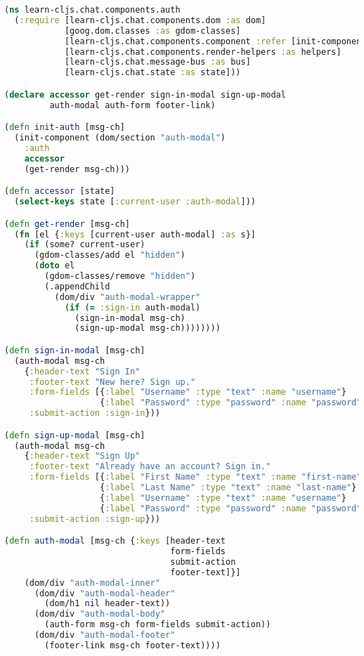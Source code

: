 \documentclass[10pt,twoside,openright]{memoir}
\begin{document}
\begin{lstlisting}[language=Clojure, caption={chat/components/auth.cljs}]
(ns learn-cljs.chat.components.auth
  (:require [learn-cljs.chat.components.dom :as dom]
            [goog.dom.classes :as gdom-classes]
            [learn-cljs.chat.components.component :refer [init-component]]
            [learn-cljs.chat.components.render-helpers :as helpers]
            [learn-cljs.chat.message-bus :as bus]
            [learn-cljs.chat.state :as state]))

(declare accessor get-render sign-in-modal sign-up-modal
         auth-modal auth-form footer-link)

(defn init-auth [msg-ch]
  (init-component (dom/section "auth-modal")
    :auth
    accessor
    (get-render msg-ch)))

(defn accessor [state]
  (select-keys state [:current-user :auth-modal]))

(defn get-render [msg-ch]
  (fn [el {:keys [current-user auth-modal] :as s}]
    (if (some? current-user)
      (gdom-classes/add el "hidden")
      (doto el
        (gdom-classes/remove "hidden")
        (.appendChild
          (dom/div "auth-modal-wrapper"
            (if (= :sign-in auth-modal)
              (sign-in-modal msg-ch)
              (sign-up-modal msg-ch))))))))

(defn sign-in-modal [msg-ch]
  (auth-modal msg-ch
    {:header-text "Sign In"
     :footer-text "New here? Sign up."
     :form-fields [{:label "Username" :type "text" :name "username"}
                   {:label "Password" :type "password" :name "password"}]
     :submit-action :sign-in}))

(defn sign-up-modal [msg-ch]
  (auth-modal msg-ch
    {:header-text "Sign Up"
     :footer-text "Already have an account? Sign in."
     :form-fields [{:label "First Name" :type "text" :name "first-name"}
                   {:label "Last Name" :type "text" :name "last-name"}
                   {:label "Username" :type "text" :name "username"}
                   {:label "Password" :type "password" :name "password"}]
     :submit-action :sign-up}))

(defn auth-modal [msg-ch {:keys [header-text
                                 form-fields
                                 submit-action
                                 footer-text]}]
    (dom/div "auth-modal-inner"
      (dom/div "auth-modal-header"
        (dom/h1 nil header-text))
      (dom/div "auth-modal-body"
        (auth-form msg-ch form-fields submit-action))
      (dom/div "auth-modal-footer"
        (footer-link msg-ch footer-text))))


\end{lstlisting}
\end{document}
